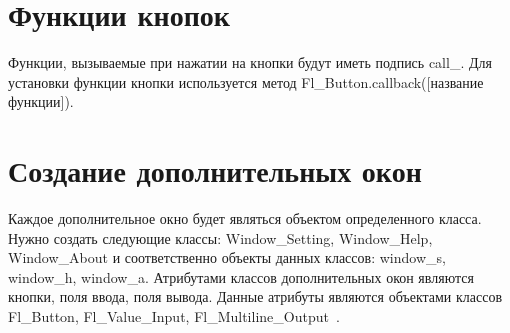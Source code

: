 \section{Функции кнопок}
Функции, вызываемые при нажатии на кнопки будут иметь подпись call\_. Для установки функции кнопки используется метод Fl\_Button.callback([название функции]).

\section{Создание дополнительных окон}
Каждое дополнительное окно будет являться объектом определенного класса. Нужно создать следующие классы: Window\_Setting, Window\_Help, Window\_About и соответственно объекты данных классов: window\_s, window\_h, window\_a. Атрибутами классов дополнительных окон являются кнопки, поля ввода, поля вывода. Данные атрибуты являются объектами классов Fl\_Button, Fl\_Value\_Input, Fl\_Multiline\_Output~\cite{docFl}.

